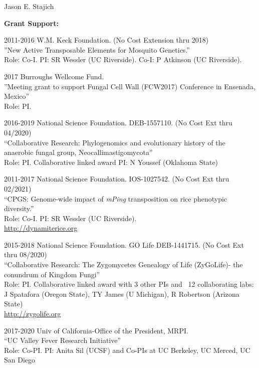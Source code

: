 \documentclass[10pt]{article}
\begin{document}
\begin{cv}{\centerline{Jason E. Stajich}}
\begin{cvlistcompact}{\bf Grant Support:}
  \item [2011-2016] W.M. Keck Foundation. (No Cost Extension thru 2018) \\
''New Active Transposable Elements for Mosquito Genetics.'' \\
Role: Co-I. PI: SR Wessler (UC Riverside). Co-I: P Atkinson (UC Riverside).

\item [2017] Burroughs Wellcome Fund. \\
''Meeting grant to support Fungal Cell Wall (FCW2017) Conference in Ensenada, Mexico'' \\
Role: PI.

\item [2016-2019] National Science Foundation. DEB-1557110. (No Cost Ext thru 04/2020) \\
``Collaborative Research: Phylogenomics and evolutionary history of the anaerobic fungal group, Neocallimastigomycota'' \\
Role: PI. Collaborative linked award PI: N Youssef (Oklahoma State)

\item [2011-2017] National Science Foundation. IOS-1027542.  (No Cost Ext thru 02/2021) \\
  ``CPGS: Genome-wide impact of \textit{mPing} transposition on rice phenotypic diversity.'' \\
Role: Co-I. PI: SR Wessler (UC Riverside). \\
\url{http://dynamiterice.org}

\item [2015-2018] National Science Foundation. GO Life DEB-1441715. (No Cost Ext thru 08/2020) \\
``Collaborative Research: The Zygomycetes Genealogy of Life
  (ZyGoLife)- the conundrum of Kingdom Fungi'' \\
  Role: PI. Collaborative linked award with 3 other PIs and ~12
  collaborating labs: J Spatafora (Oregon State), TY James (U
  Michigan), R Robertson (Arizona State) \\
\url{http://zygolife.org}

\item [2017-2020] Univ of California-Office of the President, MRPI. \\
``UC Valley Fever Research Initiative'' \\
Role: Co-PI.  PI: Anita Sil (UCSF) and Co-PIs at UC Berkeley, UC Merced,
UC San Diego


\end{cvlistcompact}
\end{cv}
\end{document}
